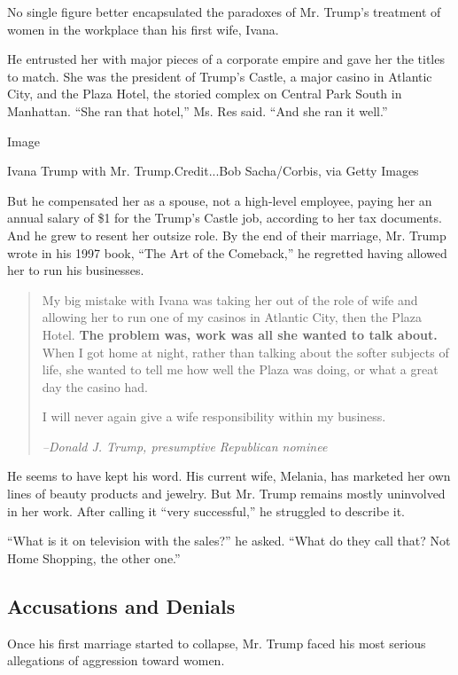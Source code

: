 No single figure better encapsulated the paradoxes of Mr. Trump's
treatment of women in the workplace than his first wife, Ivana.

He entrusted her with major pieces of a corporate empire and gave her
the titles to match. She was the president of Trump's Castle, a major
casino in Atlantic City, and the Plaza Hotel, the storied complex on
Central Park South in Manhattan. ``She ran that hotel,'' Ms. Res said.
``And she ran it well.''

Image

Ivana Trump with Mr. Trump.Credit...Bob Sacha/Corbis, via Getty Images

But he compensated her as a spouse, not a high-level employee, paying
her an annual salary of \$1 for the Trump's Castle job, according to her
tax documents. And he grew to resent her outsize role. By the end of
their marriage, Mr. Trump wrote in his 1997 book, ``The Art of the
Comeback,'' he regretted having allowed her to run his businesses.

\begin{quote}
My big mistake with Ivana was taking her out of the role of wife and
allowing her to run one of my casinos in Atlantic City, then the Plaza
Hotel. \textbf{The problem was, work was all she wanted to talk about.}
When I got home at night, rather than talking about the softer subjects
of life, she wanted to tell me how well the Plaza was doing, or what a
great day the casino had.

I will never again give a wife responsibility within my business.

\emph{--Donald J. Trump, presumptive Republican nominee}
\end{quote}

He seems to have kept his word. His current wife, Melania, has marketed
her own lines of beauty products and jewelry. But Mr. Trump remains
mostly uninvolved in her work. After calling it ``very successful,'' he
struggled to describe it.

``What is it on television with the sales?'' he asked. ``What do they
call that? Not Home Shopping, the other one.''

\hypertarget{accusations-and-denials}{%
\subsection{Accusations and Denials}\label{accusations-and-denials}}

Once his first marriage started to collapse, Mr. Trump faced his most
serious allegations of aggression toward women.

